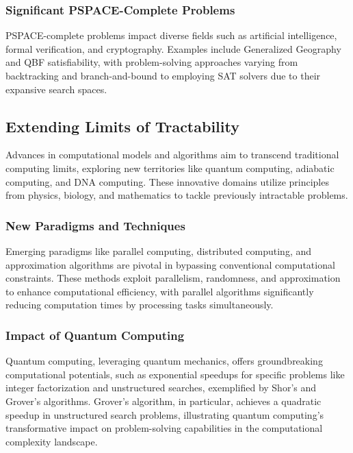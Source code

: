 \subsubsection{Significant PSPACE-Complete Problems}

PSPACE-complete problems impact diverse fields such as artificial intelligence, formal verification, and cryptography. Examples include Generalized Geography and QBF satisfiability, with problem-solving approaches varying from backtracking and branch-and-bound to employing SAT solvers due to their expansive search spaces.

\subsection{Extending Limits of Tractability}

Advances in computational models and algorithms aim to transcend traditional computing limits, exploring new territories like quantum computing, adiabatic computing, and DNA computing. These innovative domains utilize principles from physics, biology, and mathematics to tackle previously intractable problems.

\subsubsection{New Paradigms and Techniques}

Emerging paradigms like parallel computing, distributed computing, and approximation algorithms are pivotal in bypassing conventional computational constraints. These methods exploit parallelism, randomness, and approximation to enhance computational efficiency, with parallel algorithms significantly reducing computation times by processing tasks simultaneously.

\subsubsection{Impact of Quantum Computing}

Quantum computing, leveraging quantum mechanics, offers groundbreaking computational potentials, such as exponential speedups for specific problems like integer factorization and unstructured searches, exemplified by Shor's and Grover's algorithms. Grover's algorithm, in particular, achieves a quadratic speedup in unstructured search problems, illustrating quantum computing's transformative impact on problem-solving capabilities in the computational complexity landscape.

